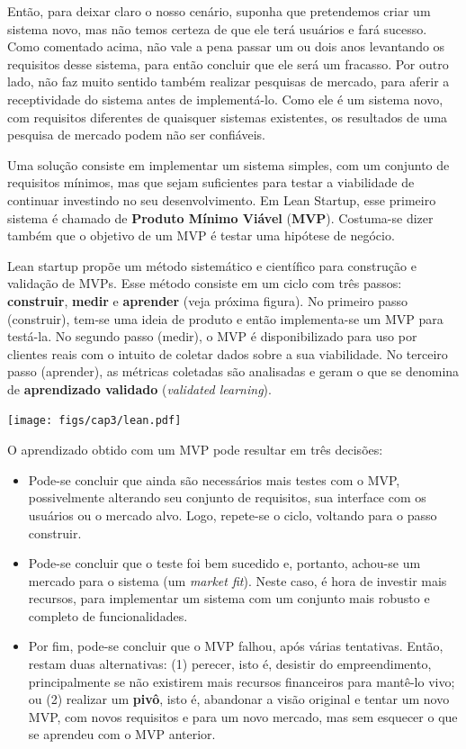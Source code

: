 \documentclass[
  11pt,
  twoside]{book}
\let\origfigure\figure
\let\endorigfigure\endfigure
\renewenvironment{figure}[1][2] {
    \expandafter\origfigure\expandafter[!h]
} {
    \endorigfigure
}
\begin{document}
Então, para deixar claro o nosso cenário, suponha que pretendemos criar
um sistema novo, mas não temos certeza de que ele terá usuários e fará
sucesso. Como comentado acima, não vale a pena passar um ou dois anos
levantando os requisitos desse sistema, para então concluir que ele será
um fracasso. Por outro lado, não faz muito sentido também realizar
pesquisas de mercado, para aferir a receptividade do sistema antes de
implementá-lo. Como ele é um sistema novo, com requisitos diferentes de
quaisquer sistemas existentes, os resultados de uma pesquisa de mercado
podem não ser confiáveis.

Uma solução consiste em implementar um sistema simples, com um conjunto
de requisitos mínimos, mas que sejam suficientes para testar a
viabilidade de continuar investindo no seu desenvolvimento. Em Lean
Startup, esse primeiro sistema é chamado de \textbf{Produto Mínimo
Viável} (\textbf{MVP}). Costuma-se dizer também que o objetivo de um MVP
é testar uma hipótese de negócio.

Lean startup propõe um método sistemático e científico para construção e
validação de MVPs. Esse método consiste em um ciclo com três passos:
\textbf{construir}, \textbf{medir} e \textbf{aprender} (veja próxima
figura). No primeiro passo (construir), tem-se uma ideia de produto e
então implementa-se um MVP para testá-la. No segundo passo (medir), o
MVP é disponibilizado para uso por clientes reais com o intuito de
coletar dados sobre a sua viabilidade. No terceiro passo (aprender), as
métricas coletadas são analisadas e geram o que se denomina de
\textbf{aprendizado validado} (\emph{validated learning}).

\begin{figure}
\centering
\texttt{[image: figs/cap3/lean.pdf]}
\caption{Método Lean Startup para validação de MVPs}
\end{figure}

O aprendizado obtido com um MVP pode resultar em três decisões:

\begin{itemize}
\item
  Pode-se concluir que ainda são necessários mais testes com o MVP,
  possivelmente alterando seu conjunto de requisitos, sua interface com
  os usuários ou o mercado alvo. Logo, repete-se o ciclo, voltando para
  o passo construir.
\item
  Pode-se concluir que o teste foi bem sucedido e, portanto, achou-se um
  mercado para o sistema (um \emph{market fit}). Neste caso, é hora de
  investir mais recursos, para implementar um sistema com um conjunto
  mais robusto e completo de funcionalidades.
\item
  Por fim, pode-se concluir que o MVP falhou, após várias tentativas.
  Então, restam duas alternativas: (1) perecer, isto é, desistir do
  empreendimento, principalmente se não existirem mais recursos
  financeiros para mantê-lo vivo; ou (2) realizar um \textbf{pivô}, isto
  é, abandonar a visão original e tentar um novo MVP, com novos
  requisitos e para um novo mercado, mas sem esquecer o que se aprendeu
  com o MVP anterior.
\end{itemize}
\end{document}
